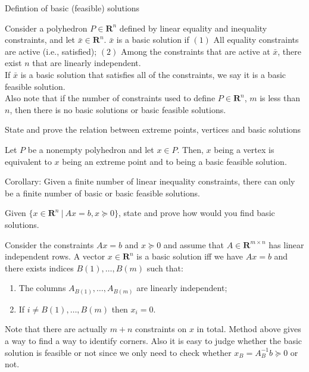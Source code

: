 \documentclass[11pt]{article}
\newcommand{\reals}{\mathbf{R}}
\newcommand*{\xfield}[1]{\begin{mdframed}\centering #1\end{mdframed}\bigskip}
\newenvironment{field}{}{}
\newenvironment{note}{}{}
\begin{document}
%
\begin{note}
  \xfield{Defintion of basic (feasible) solutions}
  \begin{field}
    Consider a polyhedron \(P \in \reals^n\) defined by linear
    equality and inequality constraints, and let
    \(\bar{x} \in \reals^n\). \(\bar{x}\) is a basic solution if
    \((1)\) All equality constraints are active (i.e., satisfied);
    \((2)\) Among the constraints that are active at \(\bar{x}\),
    there exist \(n\) that are linearly independent.
    \\

    If \(\bar{x}\) is a basic solution that satisfies all of the
    constraints, we say it is a basic feasible solution.
    \\

    Also note that if the number of constraints used to define \(P \in
    \reals^n\), \(m\) is less than \(n\), then there is no basic
    solutions or basic feasible solutions.
  \end{field}
\end{note}
%
\begin{note}
  \xfield{State and prove the relation between extreme points,
    vertices and basic solutions}
  \begin{field}
    Let \(P\) be a nonempty polyhedron and let \(x \in P\). Then,
    \(x\) being a vertex is equivalent to \(x\) being an extreme point
    and to being a basic feasible solution.

    Corollary: Given a finite number of linear inequality constraints,
    there can only be a finite number of basic or basic feasible
    solutions.
  \end{field}
\end{note}
%
\begin{note}
  \xfield{Given \(\{x \in \reals^n ~|~ Ax = b, x \succeq 0\}\), state
    and prove how would you find basic solutions.}
  \begin{field}
    Consider the constraints \(Ax = b\) and \(x \succeq 0\) and assume
    that \(A \in \reals^{m \times n}\) has linear independent rows. A
    vector \(x \in \reals^n\) is a basic solution iff we have \(Ax =
    b\) and there exists indices \(B(1), \ldots, B(m)\) such that:
    \begin{enumerate}
    \item The columns \(A_{B(1)}, \ldots, A_{B(m)}\) are linearly
      independent;
    \item If \(i \not = B(1), \ldots, B(m)\) then \(x_i = 0\).
    \end{enumerate}
    Note that there are actually \(m + n\) constraints on \(x\) in
    total. Method above gives a way to find a way to identify
    corners. Also it is easy to judge whether the basic solution is
    feasible or not since we only need to check whether \(x_B =
    A^{-1}_B b \succeq 0\) or not.
  \end{field}
\end{note}
\end{document}

